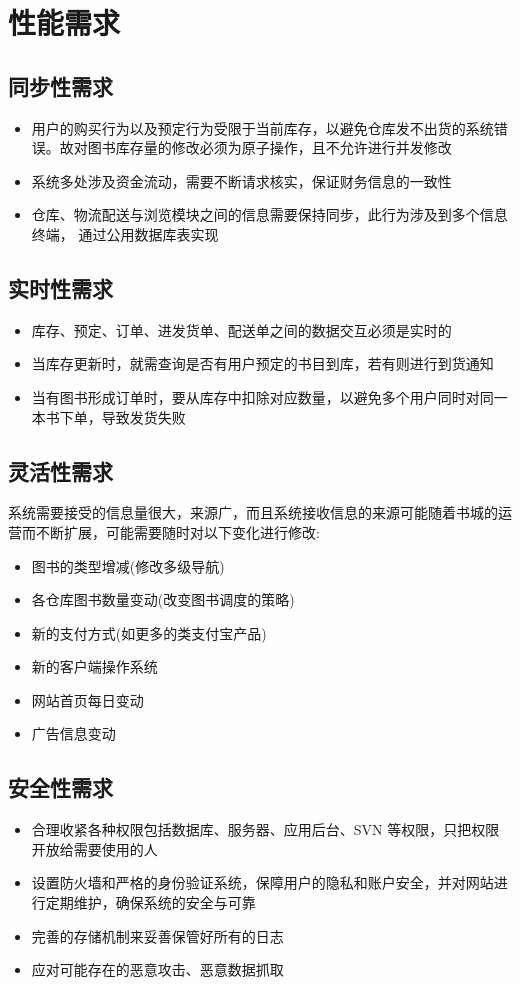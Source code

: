 \section{性能需求}
\subsection{同步性需求}
\begin{itemize}
	\item 用户的购买行为以及预定行为受限于当前库存，以避免仓库发不出货的系统错误。故对图书库存量的修改必须为原子操作，且不允许进行并发修改
	\item 系统多处涉及资金流动，需要不断请求核实，保证财务信息的一致性
	\item 仓库、物流配送与浏览模块之间的信息需要保持同步，此行为涉及到多个信息终端，	通过公用数据库表实现
\end{itemize}
\subsection{实时性需求}
\begin{itemize}
	\item 库存、预定、订单、进发货单、配送单之间的数据交互必须是实时的
	\item 当库存更新时，就需查询是否有用户预定的书目到库，若有则进行到货通知
	\item 当有图书形成订单时，要从库存中扣除对应数量，以避免多个用户同时对同一本书下单，导致发货失败
\end{itemize}
\subsection{灵活性需求}
系统需要接受的信息量很大，来源广，而且系统接收信息的来源可能随着书城的运营而不断扩展，可能需要随时对以下变化进行修改:
\begin{itemize}
	\item 图书的类型增减(修改多级导航)
	\item 各仓库图书数量变动(改变图书调度的策略)
	\item 新的支付方式(如更多的类支付宝产品)
	\item 新的客户端操作系统
	\item 网站首页每日变动
	\item 广告信息变动
\end{itemize}
\subsection{安全性需求}
\begin{itemize}
	\item 合理收紧各种权限包括数据库、服务器、应用后台、SVN 等权限，只把权限开放给需要使用的人
	\item 设置防火墙和严格的身份验证系统，保障用户的隐私和账户安全，并对网站进行定期维护，确保系统的安全与可靠
	\item 完善的存储机制来妥善保管好所有的日志
	\item 应对可能存在的恶意攻击、恶意数据抓取
\end{itemize}
